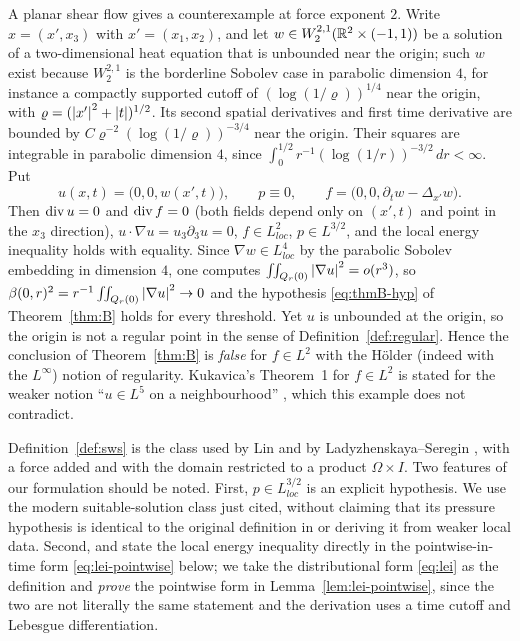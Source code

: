 \documentclass[11pt,reqno]{amsart}
\begin{document}
\begin{remark}\label{rem:shear}
A planar shear flow gives a counterexample at force exponent $2$. Write
$x=(x',x_{3})$ with $x'=(x_{1},x_{2})$, and let
$w\in W^{2,1}_{2}(\mathbb{R}^{2}\times(-1,1))$ be a solution of a two-dimensional heat
equation that is unbounded near the origin; such $w$ exist because
$W^{2,1}_{2}$ is the borderline Sobolev case in parabolic dimension $4$, for
instance a compactly supported cutoff of $(\log(1/\varrho))^{1/4}$ near
the origin, with $\varrho=(\left\lvert x' \right\rvert^{2}+\left\lvert t \right\rvert)^{1/2}$. Its second
spatial derivatives and first time derivative are bounded by
$C\varrho^{-2}(\log(1/\varrho))^{-3/4}$ near the origin. Their squares are
integrable in parabolic dimension $4$, since
$\int_{0}^{1/2} r^{-1}(\log(1/r))^{-3/2}\,dr<\infty$. Put
\[
  u(x,t)=\bigl(0,0,w(x',t)\bigr),\qquad p\equiv0,\qquad
  f=\bigl(0,0,\partial_{t}w-\Delta_{x'}w\bigr).
\]
Then $\operatorname{div} u=0$ and $\operatorname{div} f=0$ (both fields depend only on $(x',t)$ and point in
the $x_{3}$ direction), $u\cdot\nabla u=u_{3}\partial_{3}u=0$, $f\in L^{2}_{loc}$,
$p\in L^{3/2}$, and the local energy inequality holds with equality. Since
$\nabla w\in L^{4}_{loc}$ by the parabolic Sobolev embedding in dimension $4$,
one computes $\iint_{Q_{r}(0)}\left\lvert \nabla u \right\rvert^{2}=o(r^{3})$, so
$\beta(0,r)^{2}=r^{-1}\iint_{Q_{r}(0)}\left\lvert \nabla u \right\rvert^{2}\to0$ and the
hypothesis \eqref{eq:thmB-hyp} of Theorem~\ref{thm:B} holds for every threshold.
Yet $u$ is unbounded at the origin, so the origin is not a regular point in the
sense of Definition~\ref{def:regular}. Hence the conclusion of
Theorem~\ref{thm:B} is \emph{false} for $f\in L^{2}$ with the H\"older (indeed
with the $L^{\infty}$) notion of regularity. Kukavica's Theorem~1 for
$f\in L^{2}$ is stated for the weaker notion ``$u\in L^{5}$ on a
neighbourhood'' \cite[p.~719]{Kukavica2008}, which this example does not
contradict.
\end{remark}

\begin{remark}\label{rem:definition-sources}
Definition~\ref{def:sws} is the class used by Lin \cite[\S2]{Lin1998} and by
Ladyzhenskaya--Seregin \cite[Definition 2.1]{LadyzhenskayaSeregin1999}, with a
force added and with the domain restricted to a product $\Omega\times I$. Two
features of our formulation should be noted. First, $p\in L^{3/2}_{loc}$
is an explicit hypothesis. We use the modern suitable-solution class just
cited, without claiming that its pressure hypothesis is identical to the
original definition in \cite{CKN1982} or deriving it from weaker local data.
Second, \cite{LadyzhenskayaSeregin1999} and \cite{Kukavica2008} state the
local energy inequality directly in the pointwise-in-time form
\eqref{eq:lei-pointwise} below; we take the distributional form \eqref{eq:lei}
as the definition and \emph{prove} the pointwise form in
Lemma~\ref{lem:lei-pointwise}, since the two are not literally the same
statement and the derivation uses a time cutoff and Lebesgue differentiation.
\end{remark}
\end{document}

